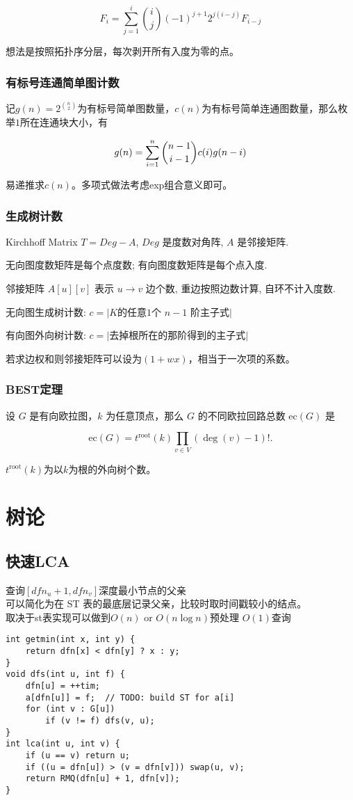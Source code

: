 \documentclass[twoside]{article}
\begin{document}
$$
F_i=\sum_{j=1}^i \binom{i}{j}(-1)^{j+1}2^{j(i-j)}F_{i-j}
$$

想法是按照拓扑序分层，每次剥开所有入度为零的点。

\subsubsection{有标号连通简单图计数}

记$g(n)=2^{\binom n2}$为有标号简单图数量，$c(n)$为有标号简单连通图数量，那么枚举$1$所在连通块大小，有

$$
g(n) = \sum_{i=1}^n \dbinom{n-1}{i-1}c(i)g(n-i)
$$

易递推求$c(n)$。多项式做法考虑exp组合意义即可。

\subsubsection{生成树计数}
Kirchhoff Matrix $T = Deg - A$, $Deg$ 是度数对角阵, $A$ 是邻接矩阵. 

无向图度数矩阵是每个点度数; 有向图度数矩阵是每个点入度.

邻接矩阵 $A[u][v]$ 表示 $u \to v$ 边个数, 重边按照边数计算, 自环不计入度数.

无向图生成树计数: $c = |K$的任意$1$个 $n-1$ 阶主子式$|$

有向图外向树计数: $c = |$去掉根所在的那阶得到的主子式$|$

若求边权和则邻接矩阵可以设为$(1+wx)$，相当于一次项的系数。

\subsubsection{BEST定理}
设 $G$ 是有向欧拉图，$k$ 为任意顶点，那么 $G$ 的不同欧拉回路总数 $\mathrm{ec}(G)$ 是

$$
\mathrm{ec}(G) = t^\mathrm{root}(k)\prod_{v\in V}(\deg (v) - 1)!.
$$

$t^\mathrm{root}(k)$为以$k$为根的外向树个数。\clearpage\section{树论}
\subsection{快速LCA}
\noindent 查询$[dfn_u + 1 , dfn_v]$深度最小节点的父亲\\
可以简化为在 ST 表的最底层记录父亲，比较时取时间戳较小的结点。\\
取决于st表实现可以做到$O(n)$ or $O(n\log n)$预处理 $O(1)$查询
\begin{lstlisting}
int getmin(int x, int y) {
	return dfn[x] < dfn[y] ? x : y;
}
void dfs(int u, int f) {
	dfn[u] = ++tim;
	a[dfn[u]] = f;  // TODO: build ST for a[i]
	for (int v : G[u])
		if (v != f) dfs(v, u);
}
int lca(int u, int v) {
	if (u == v) return u;
	if ((u = dfn[u]) > (v = dfn[v])) swap(u, v);
	return RMQ(dfn[u] + 1, dfn[v]);
}\end{lstlisting}
\end{document}

